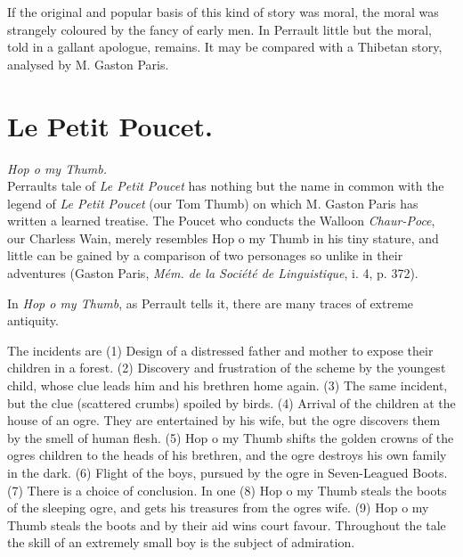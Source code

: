 \documentclass[14pt,a4paper]{memoir}
\newcommand{\notesection}[1]{%
  \addtonotes{\protect\par\protect\vspace{2ex}\protect\noindent\textbf{#1}\protect\par\protect\vspace{1ex}}%
}
\begin{document}
{If the original and popular basis of this kind of story was moral, the
moral was strangely coloured by the fancy of early men. In Perrault
little but the moral, told in a gallant apologue, remains. It may be
compared with a Thibetan story, analysed by M. Gaston
Paris.

\section{Le Petit Poucet.}
\notesection{Le Petit Poucet.}

\emph{Hop o\textquotesingle{} my Thumb.} \\

Perrault\textquotesingle s tale of \emph{Le Petit Poucet} has nothing
but the name in common with the legend of \emph{Le Petit Poucet} (our
\textquotesingle Tom Thumb\textquotesingle) on which M. Gaston Paris has
written a learned treatise. The Poucet who conducts the Walloon
\emph{Chaur-Poce}, our \textquotesingle Charles\textquotesingle s
Wain,\textquotesingle{} merely resembles Hop o\textquotesingle{} my
Thumb in his tiny stature, and little can be gained by a comparison of
two personages so unlike in their adventures (Gaston Paris, \emph{Mém.
de la Société de Linguistique}, i. 4, p. 372).

In \emph{Hop o\textquotesingle{} my Thumb}, as Perrault tells it, there
are many traces of extreme antiquity.

The incidents are (1) Design of a distressed father and mother to expose
their children in a forest. (2) Discovery and frustration of the scheme
by the youngest child, whose clue leads him and his brethren home again.
(3) The same incident, but the clue (scattered crumbs) spoiled by birds.
(4) Arrival of the children at the house of an ogre. They are
entertained by his wife, but the ogre discovers them by the smell of
human flesh. (5) Hop o\textquotesingle{} my Thumb shifts the golden
crowns of the ogre\textquotesingle s children to the heads of his
brethren, and the ogre destroys his own family in the dark. (6) Flight
of the boys, pursued by the ogre in Seven-Leagued Boots. (7) There is a
choice of conclusion. In one (8) Hop o\textquotesingle{} my Thumb steals
the boots of the sleeping ogre, and gets his treasures from the
ogre\textquotesingle s wife. (9) Hop o\textquotesingle{} my Thumb steals
the boots and by their aid wins court favour. Throughout the tale the
skill of an extremely small boy is the subject of admiration.

}
\end{document}
